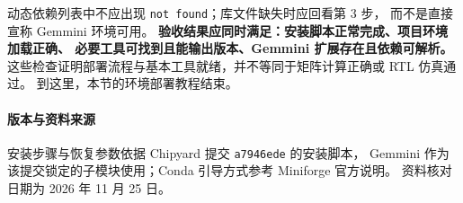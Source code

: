 动态依赖列表中不应出现 \lstinline|not found|；库文件缺失时应回看第 3 步，
而不是直接宣称 Gemmini 环境可用。
\textbf{验收结果应同时满足：安装脚本正常完成、项目环境加载正确、
必要工具可找到且能输出版本、Gemmini 扩展存在且依赖可解析。}
这些检查证明部署流程与基本工具就绪，并不等同于矩阵计算正确或 RTL 仿真通过。
到这里，本节的环境部署教程结束。

\paragraph{版本与资料来源}
安装步骤与恢复参数依据 Chipyard 提交 \texttt{a7946ede} 的安装脚本，
Gemmini 作为该提交锁定的子模块使用；Conda 引导方式参考 Miniforge 官方说明。
资料核对日期为 2026 年 11 月 25 日\cite{cysetup-a7946ede,cyinitial-a7946ede,miniforge-install}。
